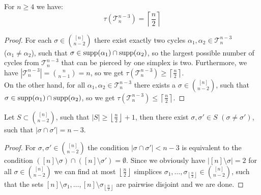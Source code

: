 \begin{lem}\label{lemma12}
For \(n\geq 4\) we have:
\[
\tau(\mathcal{T}_n^{n-3})=\left\lceil\frac{n}{2}\right\rceil
\]
\begin{proof}
For each \(\sigma\in\binom{[n]}{n-2}\) there exist exactly two cycles \(\alpha_1,\alpha_2\in\mathcal{T}_n^{n-3}\)\\
(\(\alpha_1\neq\alpha_2\)), such that \(\sigma\in \mathrm{supp}(\alpha_1)\cap \mathrm{supp}(\alpha_2)\), so the largest possible number of cycles from \(\mathcal{T}_n^{n-3}\) that can be pierced by one simplex is two. Furthermore, we have \(\left|\mathcal{T}_n^{n-3}\right|=\binom{n}{n-1}=n\), so we get \(\tau(\mathcal{T}_n^{n-3})\geq\left\lceil\frac{n}{2}\right\rceil\).\\
On the other hand, for all \(\alpha_1,\alpha_2\in\mathcal{T}_n^{n-3}\) there exists a \(\sigma\in\binom{[n]}{n-2}\), such that\\
\(\sigma\in \mathrm{supp}(\alpha_1)\cap \mathrm{supp}(\alpha_2)\), so we get \(\tau(\mathcal{T}_n^{n-3})\leq\left\lceil\frac{n}{2}\right\rceil\).
\end{proof}
\end{lem}

\begin{lem}\label{lemma13}
Let \(S\subset\binom{[n]}{n-2}\), such that \(\left|S\right|\geq\left\lfloor\frac{n}{2}\right\rfloor+1\), then there exist \(\sigma,\sigma'\in S\) \((\sigma\neq\sigma')\), such that \(\left|\sigma\cap\sigma'\right|=n-3\).
\begin{proof}
For \(\sigma,\sigma'\in\binom{[n]}{n-2}\) the condition \(\left|\sigma\cap\sigma'\right|<n-3\) is equivalent to the condition \(([n]\setminus\sigma)\cap([n]\setminus\sigma')=\emptyset\). Since we obviously have \(\left|[n]\setminus\sigma\right|=2\) for all \(\sigma\in\binom{[n]}{n-2}\) we can find at most \(\left\lfloor\frac{n}{2}\right\rfloor\) simplices \(\sigma_1,\ldots,\sigma_{\left\lfloor\frac{n}{2}\right\rfloor}\in\binom{[n]}{n-2}\), such that the sets \([n]\setminus\sigma_1,\ldots,[n]\setminus\sigma_{\left\lfloor\frac{n}{2}\right\rfloor}\) are pairwise disjoint and we are done.
\end{proof}
\end{lem}

